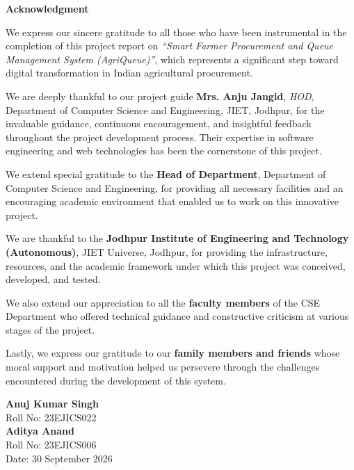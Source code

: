 \begin{center}
{\Large \bf Acknowledgment}\\
\end{center}
\vspace{10pt}
{

We express our sincere gratitude to all those who have been instrumental in the completion of this project report on \textit{``Smart Farmer Procurement and Queue Management System (AgriQueue)''}, which represents a significant step toward digital transformation in Indian agricultural procurement.

\indent We are deeply thankful to our project guide \textbf{Mrs. Anju Jangid}, \textit{HOD}, Department of Computer Science and Engineering, JIET, Jodhpur, for the invaluable guidance, continuous encouragement, and insightful feedback throughout the project development process. Their expertise in software engineering and web technologies has been the cornerstone of this project.

\indent We extend special gratitude to the \textbf{Head of Department}, Department of Computer Science and Engineering, for providing all necessary facilities and an encouraging academic environment that enabled us to work on this innovative project.

\indent We are thankful to the \textbf{Jodhpur Institute of Engineering and Technology (Autonomous)}, JIET Universe, Jodhpur, for providing the infrastructure, resources, and the academic framework under which this project was conceived, developed, and tested.

\indent We also extend our appreciation to all the \textbf{faculty members} of the CSE Department who offered technical guidance and constructive criticism at various stages of the project.

\indent Lastly, we express our gratitude to our \textbf{family members and friends} whose moral support and motivation helped us persevere through the challenges encountered during the development of this system.
}

\vspace{0.8cm}
\noindent
\textbf{Anuj Kumar Singh}\\
Roll No: 23EJICS022\\[0.35cm]
\textbf{Aditya Anand}\\
Roll No: 23EJICS006\\[0.35cm]
Date: 30 September 2026